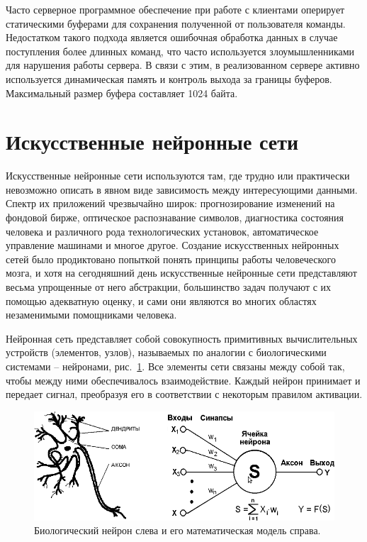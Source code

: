 \documentclass[12pt, a4paper, oneside]{article}
\begin{document}
Часто серверное программное обеспечение при работе с клиентами оперирует статическими буферами для сохранения полученной от пользователя команды. Недостатком такого подхода является ошибочная обработка данных в случае поступления более длинных команд, что часто используется злоумышленниками для нарушения работы сервера. В связи с этим, в реализованном сервере активно используется динамическая память и контроль выхода за границы буферов. Максимальный размер буфера составляет 1024 байта.

\section{Искусственные нейронные сети}

Искусственные нейронные сети используются там, где трудно или практически невозможно описать в явном виде зависимость между интересующими данными. Спектр их приложений чрезвычайно широк: прогнозирование изменений на фондовой бирже, оптическое распознавание символов, диагностика состояния человека и различного рода технологических установок, автоматическое управление машинами и многое другое. Создание искусственных нейронных сетей было продиктовано попыткой понять принципы работы человеческого мозга, и хотя на сегодняшний день искусственные нейронные сети представляют весьма упрощенные от него абстракции, большинство задач получают с их помощью адекватную оценку, и сами они являются во многих областях незаменимыми помощниками человека. 

Нейронная сеть представляет собой совокупность примитивных вычислительных устройств (элементов, узлов), называемых по аналогии с биологическими системами –   нейронами, рис.~\ref{fig:neurons}. Все элементы сети связаны между собой так, чтобы между ними обеспечивалось взаимодействие. Каждый нейрон принимает и передает сигнал, преобразуя его в соответствии с некоторым правилом активации. 

\begin{figure}[t!]
\begin{center}
	\includegraphics[scale=0.35]{neurons.png}
	\caption{Биологический нейрон слева и его математическая модель справа.}
	\label{fig:neurons}
        \vspace{-0.5cm}
\end{center}
\end{figure}
\end{document}
